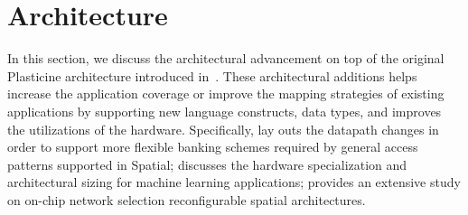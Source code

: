 \chapter{Architecture}

In this section, we discuss the architectural advancement on top of the original Plasticine architecture
introduced in~\cite{plasticine}. These architectural additions helps increase the application
coverage or improve the mapping strategies of existing applications by supporting new language
constructs, data types, and improves the utilizations of the hardware. 
Specifically,  lay outs the datapath changes in order to support more
flexible banking schemes required by general access patterns supported in Spatial; 
 discusses the hardware specialization and architectural sizing for machine
learning applications;  provides an extensive study on on-chip network selection 
reconfigurable spatial architectures.
